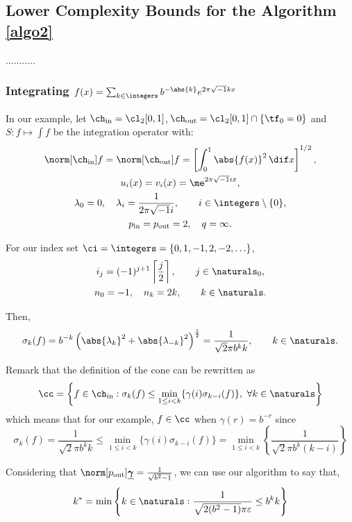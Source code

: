 \documentclass[final]{elsarticle}
\newcommand{\chin}{\ch_{\text{\rm{in}}}}
\newcommand{\chout}{\ch_{\text{\rm{out}}}}
\newcommand{\pin}{p_{\text{\rm{in}}}}
\newcommand{\pout}{p_{\text{\rm{out}}}}
\newcommand{\bgamma}{\underline{\boldsymbol\gamma}}
\theoremstyle{definition}
\theoremstyle{remark}
\begin{document}
\subsection{Lower Complexity Bounds for the Algorithm \ref{algo2}}
...........

\subsubsection{Integrating $f(x)=\sum_{k\in\integers}b^{-\abs{k}}e^{2\pi\sqrt{-1}kx}$}

In our example, let $\chin=\cl_2[0,1]$,$\,\chout=\cl_2[0,1]\cap\{\tf_0=0\}$ and $S: f \mapsto \int f$ be the integration operator with:
\begin{gather*}
\norm[\chin]{f} = \norm[\chout]{f} = \left[\int_0^1 \abs{f(x)}^2 \, \dif x \right]^{1/2}, \\
u_{i}(x) = v_i(x) = \me^{2 \pi \sqrt{-1} i x},\\
\lambda_0=0, \quad \lambda_i=\frac{1}{2\pi\sqrt{-1}i}, \qquad i \in \integers\setminus\{0\},\\
\pin=\pout=2,\quad q=\infty.
\end{gather*}

For our index set $\ci=\integers=\{0,1,-1,2,-2,\ldots\}$,
\begin{gather*}
i_j=(-1)^{j+1}\left\lceil\frac{j}{2}\right\rceil,\qquad j\in\naturals_0,\\
n_0=-1,\quad n_k=2k, \qquad k\in\naturals.
\end{gather*}

Then,
\begin{equation*} \sigma_k(f)=b^{-k}\left(\abs{\lambda_{k}}^2+\abs{\lambda_{-k}}^2\right)^{\frac{1}{2}}=\frac{1}{\sqrt{2}\pi b^kk}, \qquad k \in\naturals.
\end{equation*}

Remark that the definition of the cone can be rewritten as
\begin{equation}
\cc = \left\{ f \in \chin : \sigma_k(f) \le \min_{1 \le i < k}\{\gamma(i)\sigma_{k-i}(f)\}, \ \forall k \in \naturals \right\}
\end{equation}
which means that for our example, $f\in\cc$ when $\gamma(r)=b^{-r}$ since
\begin{equation*}
\sigma_k(f)=\frac{1}{\sqrt{2}\pi b^kk} \le \min_{1 \le i <k}\{\gamma(i)\sigma_{k-i}(f)\}=\min_{1 \le i <k}\left\{\frac{1}{\sqrt{2}\pi b^k(k-i)}\right\}
\end{equation*}

Considering that $\norm[\pout]{\bgamma}=\frac{1}{\sqrt{b^2-1}}$, we can use our algorithm to say that,
\begin{equation*}
k^*=\min\left\{k\in\naturals:\frac{1}{\sqrt{2(b^2-1)}\pi\varepsilon} \le b^kk \right\}
\end{equation*}
\end{document}
